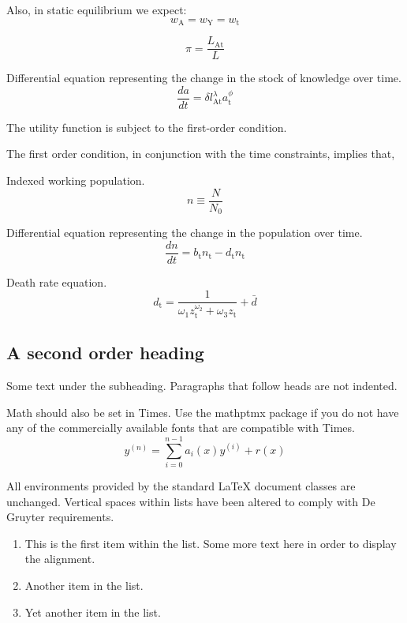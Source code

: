 \documentclass[letterpaper,12pt]{article}
\begin{document}
Also, in static equilibrium we expect:
\begin{equation}
w_\mathrm{A} = w_\mathrm{Y} = w_\mathrm{t}
\end{equation}

\begin{equation}
\pi = \frac{L_\mathrm{At}}{L}
\end{equation}

Differential equation representing the change in the stock of knowledge over time.
\begin{equation} \label{eq:da_dt}
\frac{da}{dt} = \delta l_\mathrm{At}^\lambda a_\mathrm{t}^\phi
\end{equation}

The utility function is subject to the first-order condition.


The first order condition, in conjunction with the time constraints, implies that,

Indexed working population.
\begin{equation}
n \equiv \frac{N}{N_\mathrm{0}}
\end{equation}

Differential equation representing the change in the population over time.
\begin{equation}
\frac{dn}{dt} = b_\mathrm{t} n_\mathrm{t} - d_\mathrm{t} n_\mathrm{t}
\end{equation}

Death rate equation.
\begin{equation} \label{deathrate}
d_\mathrm{t} = \frac{1}{\omega_\mathrm{1} z_\mathrm{t}^{\omega_\mathrm{2}} + \omega_\mathrm{3} z_\mathrm{t}} + \bar d
\end{equation}

\subsection{A second order heading}

Some text under the subheading. Paragraphs that follow heads are not
indented.

Math should also be set in Times. Use the mathptmx package if you do not have
any of the commercially available fonts that are compatible with Times.
\begin{equation}
    y^{(n)} = \sum_{i=0}^{n-1} a_i(x) y^{(i)} + r(x) 
\end{equation}

All environments provided by the standard LaTeX document classes are
unchanged. Vertical spaces within lists have been altered to comply with De Gruyter
requirements.
\begin{enumerate}
\item This is the first item within the list. Some more text here in order to
  display the alignment.
\item Another item in the list.
\item Yet another item in the list.
\end{enumerate}
\end{document}
